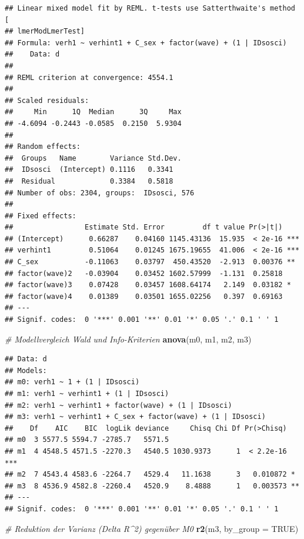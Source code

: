 \documentclass[
]{book}
\newenvironment{Shaded}{\begin{snugshade}}{\end{snugshade}}
\newcommand{\CommentTok}[1]{\textcolor[rgb]{0.56,0.35,0.01}{\textit{#1}}}
\newcommand{\DataTypeTok}[1]{\textcolor[rgb]{0.13,0.29,0.53}{#1}}
\newcommand{\KeywordTok}[1]{\textcolor[rgb]{0.13,0.29,0.53}{\textbf{#1}}}
\newcommand{\NormalTok}[1]{#1}
\newcommand{\OtherTok}[1]{\textcolor[rgb]{0.56,0.35,0.01}{#1}}
\begin{document}
\begin{verbatim}
## Linear mixed model fit by REML. t-tests use Satterthwaite's method [
## lmerModLmerTest]
## Formula: verh1 ~ verhint1 + C_sex + factor(wave) + (1 | IDsosci)
##    Data: d
## 
## REML criterion at convergence: 4554.1
## 
## Scaled residuals: 
##     Min      1Q  Median      3Q     Max 
## -4.6094 -0.2443 -0.0585  0.2150  5.9304 
## 
## Random effects:
##  Groups   Name        Variance Std.Dev.
##  IDsosci  (Intercept) 0.1116   0.3341  
##  Residual             0.3384   0.5818  
## Number of obs: 2304, groups:  IDsosci, 576
## 
## Fixed effects:
##                 Estimate Std. Error         df t value Pr(>|t|)    
## (Intercept)      0.66287    0.04160 1145.43136  15.935  < 2e-16 ***
## verhint1         0.51064    0.01245 1675.19655  41.006  < 2e-16 ***
## C_sex           -0.11063    0.03797  450.43520  -2.913  0.00376 ** 
## factor(wave)2   -0.03904    0.03452 1602.57999  -1.131  0.25818    
## factor(wave)3    0.07428    0.03457 1608.64174   2.149  0.03182 *  
## factor(wave)4    0.01389    0.03501 1655.02256   0.397  0.69163    
## ---
## Signif. codes:  0 '***' 0.001 '**' 0.01 '*' 0.05 '.' 0.1 ' ' 1
\end{verbatim}

\begin{Shaded}
\begin{Highlighting}[]
\CommentTok{# Modellvergleich Wald und Info-Kriterien}
\KeywordTok{anova}\NormalTok{(m0, m1, m2, m3)}
\end{Highlighting}
\end{Shaded}

\begin{verbatim}
## Data: d
## Models:
## m0: verh1 ~ 1 + (1 | IDsosci)
## m1: verh1 ~ verhint1 + (1 | IDsosci)
## m2: verh1 ~ verhint1 + factor(wave) + (1 | IDsosci)
## m3: verh1 ~ verhint1 + C_sex + factor(wave) + (1 | IDsosci)
##    Df    AIC    BIC  logLik deviance     Chisq Chi Df Pr(>Chisq)    
## m0  3 5577.5 5594.7 -2785.7   5571.5                                
## m1  4 4548.5 4571.5 -2270.3   4540.5 1030.9373      1  < 2.2e-16 ***
## m2  7 4543.4 4583.6 -2264.7   4529.4   11.1638      3   0.010872 *  
## m3  8 4536.9 4582.8 -2260.4   4520.9    8.4888      1   0.003573 ** 
## ---
## Signif. codes:  0 '***' 0.001 '**' 0.01 '*' 0.05 '.' 0.1 ' ' 1
\end{verbatim}

\begin{Shaded}
\begin{Highlighting}[]
\CommentTok{# Reduktion der Varianz (Delta R^2) gegenüber M0}
\KeywordTok{r2}\NormalTok{(m3, }\DataTypeTok{by_group =} \OtherTok{TRUE}\NormalTok{)}
\end{Highlighting}
\end{Shaded}
\end{document}
